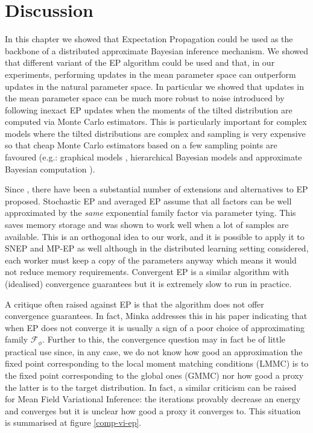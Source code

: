\section{Discussion}

In this chapter we showed that Expectation Propagation could be used as the backbone of a distributed approximate Bayesian inference mechanism. 
We showed that different variant of the EP algorithm could be used and that, in our experiments, performing updates in the mean parameter space can outperform updates in the natural parameter space. 
In particular we showed that updates in the mean parameter space can be much more robust to noise introduced by following inexact EP updates when the moments of the tilted distribution are computed via Monte Carlo estimators. This is particularly important for complex models where the tilted distributions are complex and sampling is very expensive so that cheap Monte Carlo estimators based on a few sampling points are favoured (e.g.: graphical models \citep{heess13, eslami14, jitkrittum15}, hierarchical Bayesian models \citep{gelman14} and approximate Bayesian computation \citep{barthelme11}). %

Since \cite{minka01}, there have been a substantial number of extensions and alternatives to EP proposed. Stochastic EP \citep{li15} and averaged EP \citep{dehaene15} assume that all factors can be well approximated by the \emph{same} exponential family factor via parameter tying. This saves memory storage and was shown to work well when a lot of samples are available. This is an orthogonal idea to our work, and it is possible to apply it to SNEP and MP-EP as well although in the distributed learning setting considered, each worker must keep a copy of the parameters anyway which means it would not reduce memory requirements. Convergent EP \citep{heskes03} is a similar algorithm with (idealised) convergence guarantees but it is extremely slow to run in practice. 

A critique often raised against EP is that the algorithm does not offer convergence guarantees. In fact, Minka addresses this in his paper \citep{minka01} indicating that when EP does not converge it is usually a sign of a poor choice of approximating family $\mathcal F_{\phi}$. 
Further to this, the convergence question may in fact be of little practical use since, in any case, we do not know how good an approximation the fixed point corresponding to the local moment matching conditions (LMMC) is to the fixed point corresponding to the global ones (GMMC) nor how good a proxy the latter is to the target distribution. In fact, a similar criticism can be raised for Mean Field Variational Inference: the iterations provably decrease an energy and converges but it is unclear how good a proxy it converges to. This situation is summarised at figure \ref{comp-vi-ep}.

